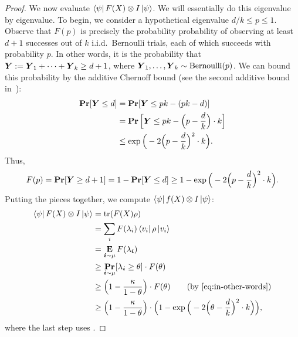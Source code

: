 \begin{proof}
    We now evaluate $\bra{\psi} F(X) \otimes I \ket{\psi}$. We will
    essentially do this eigenvalue by eigenvalue.
    To begin, we consider a hypothetical eigenvalue $d/k \leq p \leq 1$.
    Observe that $F(p)$ is precisely the
    probability 
    probability of observing at least $d+1$ successes out of $k$
    i.i.d.\ Bernoulli trials, each of which succeeds with probability
    $p$.
    In other words, it is the probability that $\boldsymbol{Y} := \boldsymbol{Y}_1 + \cdots + \boldsymbol{Y}_k \geq d+1$,
    where $\boldsymbol{Y}_1, \ldots, \boldsymbol{Y}_k \sim \mathrm{Bernoulli}(p)$.
    We can bound this probability by the additive Chernoff bound (see the second additive bound in~\cite{Blu11}):
    \begin{align*}
    \mathop{\bf Pr\/}[\boldsymbol{Y} \leq d]
    &= \mathop{\bf Pr\/}[\boldsymbol{Y} \leq p k - (pk - d)] \\
    &=\mathop{\bf Pr\/}\Big[\boldsymbol{Y} \leq pk - \Big(p - \frac{d}{k}\Big)\cdot k\Big]\\
    	&\leq  \exp\Big(-2 \Big(p - \frac{d}{k}\Big)^2 \cdot k\Big).
    \end{align*}
    Thus,
    \begin{equation}\label{eq:by-chernoff}
    F(p) = \mathop{\bf Pr\/}[\boldsymbol{Y} \geq d+1] = 1 - \mathop{\bf Pr\/}[\boldsymbol{Y} \leq d] \geq 1 - \exp\Big(-2 \Big(p - \frac{d}{k}\Big)^2 \cdot k\Big).
    \end{equation}
        Putting the pieces together, we compute $\bra{\psi} f(X) \otimes I
    \ket{\psi}$:
    \begin{align}
      \bra{\psi} F(X) \ot I \ket{\psi} &= \Tr(F(X) \rho) \nonumber\\
                                       &= \sum_{i} F(\lambda_i)
                                         \bra{v_i} \rho \ket{v_i} \nonumber\\
                                       &=\E_{\bi \sim \mu}
                                         F(\lambda_{\bi}) \nonumber\\
                                       &\geq \Pr_{\bi \sim
                                         \mu}[\lambda_{\bi} \geq \theta]
                                         \cdot F(\theta) \nonumber\\
                                       &\geq \Big( 1 - \frac{\kappa}{1 - \theta} \Big) \cdot F(\theta)  \tag{by \Cref{eq:in-other-words}}\\
      &\geq \Big( 1 - \frac{\kappa}{1 - \theta} \Big) \cdot \Big(1 - \exp \Big(-2\Big(\theta -
        \frac{d}{k}\Big)^2 \cdot k \Big) \Big) \label{eq:almost-done-with-this-giant-proof},
        \end{align}
        where the last step uses .

\end{proof}
